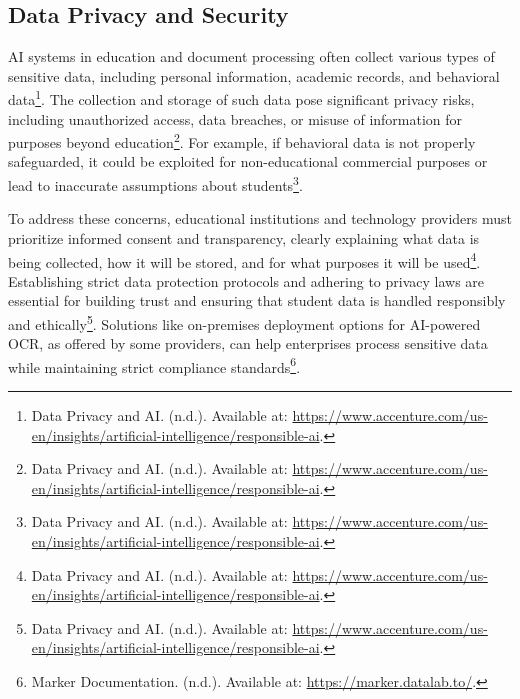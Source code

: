 \subsection{Data Privacy and Security}
AI systems in education and document processing often collect various types of sensitive data, including personal information, academic records, and behavioral data\footnote{Data Privacy and AI. (n.d.). Available at: \url{https://www.accenture.com/us-en/insights/artificial-intelligence/responsible-ai}.}. The collection and storage of such data pose significant privacy risks, including unauthorized access, data breaches, or misuse of information for purposes beyond education\footnote{Data Privacy and AI. (n.d.). Available at: \url{https://www.accenture.com/us-en/insights/artificial-intelligence/responsible-ai}.}. For example, if behavioral data is not properly safeguarded, it could be exploited for non-educational commercial purposes or lead to inaccurate assumptions about students\footnote{Data Privacy and AI. (n.d.). Available at: \url{https://www.accenture.com/us-en/insights/artificial-intelligence/responsible-ai}.}.

To address these concerns, educational institutions and technology providers must prioritize informed consent and transparency, clearly explaining what data is being collected, how it will be stored, and for what purposes it will be used\footnote{Data Privacy and AI. (n.d.). Available at: \url{https://www.accenture.com/us-en/insights/artificial-intelligence/responsible-ai}.}. Establishing strict data protection protocols and adhering to privacy laws are essential for building trust and ensuring that student data is handled responsibly and ethically\footnote{Data Privacy and AI. (n.d.). Available at: \url{https://www.accenture.com/us-en/insights/artificial-intelligence/responsible-ai}.}. Solutions like on-premises deployment options for AI-powered OCR, as offered by some providers, can help enterprises process sensitive data while maintaining strict compliance standards\footnote{Marker Documentation. (n.d.). Available at: \url{https://marker.datalab.to/}.}.

